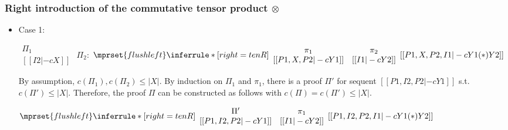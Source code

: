 \subsubsection{Right introduction of the commutative tensor product $\otimes$}
\begin{itemize}
\item Case 1:
      \begin{center}
        \scriptsize
        \begin{math}
          \begin{array}{c}
            \Pi_1 \\
            {[[I2 |-c X]]}
          \end{array}
        \end{math}
        \qquad\qquad
        $\Pi_2$:
        \begin{math}
          $$\mprset{flushleft}
          \inferrule* [right={\tiny tenR}] {
            {
              \begin{array}{cc}
                \pi_1 & \pi_2 \\
                {[[P1, X, P2 |-c Y1]]} & {[[I1 |-c Y2]]}
              \end{array}
            }
          }{[[P1, X, P2, I1 |-c Y1 (*) Y2]]}
        \end{math}
      \end{center}
      By assumption, $c(\Pi_1),c(\Pi_2)\leq |X|$. By induction on $\Pi_1$
      and $\pi_1$, there is a proof $\Pi'$ for sequent
      $[[P1, I2, P2 |-c Y1]]$ s.t. $c(\Pi') \leq |X|$. Therefore, the proof
      $\Pi$ can be constructed as follows with $c(\Pi) = c(\Pi') \leq |X|$.
      \begin{center}
        \scriptsize
        \begin{math}
          $$\mprset{flushleft}
          \inferrule* [right={\tiny tenR}] {
            {
              \begin{array}{cc}
                \Pi' & \pi_1 \\
                {[[P1, I2, P2 |-c Y1]]} & {[[I1 |-c Y2]]}
              \end{array}
            }
          }{[[P1, I2, P2, I1 |-c Y1 (*) Y2]]}
        \end{math}
      \end{center}


\end{itemize}
